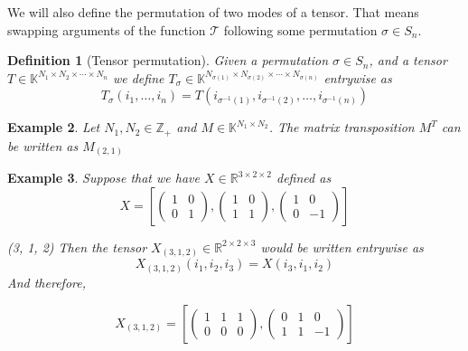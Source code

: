 \documentclass[11pt,a4paper,openright,oneside]{book}
\numberwithin{equation}{section}
\newtheorem{defn0}{Definition}[chapter]
\newtheorem{example0}[defn0]{Example}
\newenvironment{definition}{ \begin{defn0}}{\end{defn0}}
\newenvironment{example}{ \begin{example0}\rm}{\end{example0}}
\begin{document}
We will also define the permutation of two modes of a tensor. That means swapping arguments of the function $\mathcal{T}$
following some permutation $\sigma \in S_n$.

\begin{definition}[Tensor permutation]
    Given a permutation $\sigma \in S_n$, and a tensor $T \in \mathbb{K}^{N_1 \times N_2 \times \cdots \times N_n}$ we define
    $T_\sigma \in \mathbb{K}^{N_{\sigma(1)} \times N_{\sigma(2)} \times \cdots \times N_{\sigma(n)}}$ entrywise as
    $$T_\sigma (i_1, \dots, i_n) = T(i_{\sigma^{-1}(1)}, i_{\sigma^{-1}(2)}, \dots, i_{\sigma^{-1}(n)})$$
\end{definition}

\begin{example}
    Let $N_1, N_2 \in \mathbb{Z}_+$ and $M \in \mathbb{K}^{N_1 \times N_2}$. The matrix transposition $M^T$ can be written as $M_{(2, 1)}$ 
\end{example}

\begin{example}
    Suppose that we have $X \in \mathbb{R}^{3 \times 2 \times 2}$ defined as
    $$X = \left[\begin{pmatrix}
            1 & 0 \\
            0 & 1
        \end{pmatrix}, 
        \begin{pmatrix}
            1 & 0 \\
            1 & 1
        \end{pmatrix},
        \begin{pmatrix}
            1 & 0 \\
            0 & -1
        \end{pmatrix}
        \right]$$

        (3, 1, 2)
        Then the tensor $X_{(3, 1, 2)} \in \mathbb{R}^{2 \times 2 \times 3}$ would be written entrywise as
        $$X_{(3, 1, 2)}(i_1, i_2, i_3) = X(i_3, i_1, i_2)$$
        And therefore,

        $$X_{(3,1,2)} = \left[\begin{pmatrix} 1 & 1 & 1 \\ 0 & 0 & 0  \end{pmatrix}, \begin{pmatrix}  0 & 1 & 0 \\ 1 & 1 & -1 \end{pmatrix} \right]$$ 


    \label{ex:perm}
\end{example}
\end{document}
